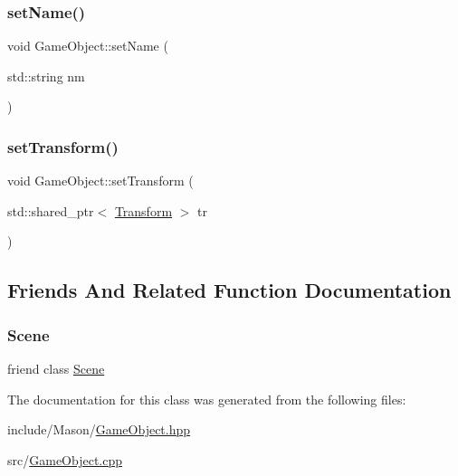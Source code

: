 \hypertarget{class_mason_1_1_game_object_af478034e4602956fc936ee4fbe05d107}{}\label{class_mason_1_1_game_object_af478034e4602956fc936ee4fbe05d107} 
\subsubsection{\texorpdfstring{set\+Name()}{setName()}}
{\footnotesize\ttfamily void Game\+Object\+::set\+Name (\begin{DoxyParamCaption}\item[{std\+::string}]{nm }\end{DoxyParamCaption})}

\hypertarget{class_mason_1_1_game_object_a354c553749dffb59fbe763f4bf26341d}{}\label{class_mason_1_1_game_object_a354c553749dffb59fbe763f4bf26341d} 
\subsubsection{\texorpdfstring{set\+Transform()}{setTransform()}}
{\footnotesize\ttfamily void Game\+Object\+::set\+Transform (\begin{DoxyParamCaption}\item[{std\+::shared\+\_\+ptr$<$ \hyperlink{class_mason_1_1_transform}{Transform} $>$}]{tr }\end{DoxyParamCaption})}



\subsection{Friends And Related Function Documentation}
\hypertarget{class_mason_1_1_game_object_a032858ae1fe02d2d1170981c2af2d67c}{}\label{class_mason_1_1_game_object_a032858ae1fe02d2d1170981c2af2d67c} 
\subsubsection{\texorpdfstring{Scene}{Scene}}
{\footnotesize\ttfamily friend class \hyperlink{class_mason_1_1_scene}{Scene}\hspace{0.3cm}{\ttfamily [friend]}}



The documentation for this class was generated from the following files\+:\begin{DoxyCompactItemize}
\item 
include/\+Mason/\hyperlink{_game_object_8hpp}{Game\+Object.\+hpp}\item 
src/\hyperlink{_game_object_8cpp}{Game\+Object.\+cpp}\end{DoxyCompactItemize}
